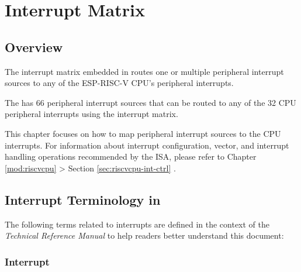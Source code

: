 \documentclass[main\_\_EN.tex]{subfiles}
\begin{document}

\ifglobal
\else
    \listoftodos
    {\let\clearpage\relax \listofdonetodos}
    \tableofcontents
\fi



\hypertarget{intmtrx}{}
\chapter{Interrupt Matrix}
\label{mod:intmtrx}
\section{Overview}

The interrupt matrix embedded in \chipname{} routes one or multiple peripheral interrupt sources to any of the ESP-RISC-V CPU's peripheral interrupts.

The \chipname{} has 66 peripheral interrupt sources that can be routed to any of the 32 CPU peripheral interrupts using the interrupt matrix.

\begin{tiplisting}
This chapter focuses on how to map peripheral interrupt sources to the CPU interrupts. For information about interrupt configuration, vector, and interrupt handling operations recommended by the ISA, please refer to Chapter \ref{mod:riscvcpu} \textit{}  > Section \ref{sec:riscvcpu-int-ctrl} \textit{}.
\end{tiplisting}
\vspace{-1em}

\section{Interrupt Terminology in \chipname{}}\label{sec:intmtx-int-terminology}

The following terms related to interrupts are defined in the context of the \textit{\chipname{} Technical Reference Manual} to help readers better understand this document:

\subsection{Interrupt}
\end{document}
